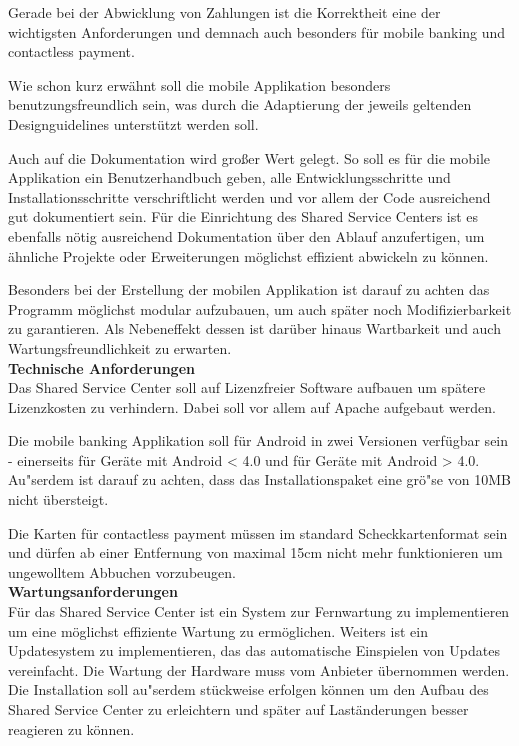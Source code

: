 Gerade bei der Abwicklung von Zahlungen ist die Korrektheit eine der wichtigsten Anforderungen und demnach auch besonders f\"ur mobile banking und contactless payment.

Wie schon kurz erw\"ahnt soll die mobile Applikation besonders benutzungsfreundlich sein, was durch die Adaptierung der jeweils geltenden Designguidelines unterst\"utzt werden soll.

Auch auf die Dokumentation wird gro\ss er Wert gelegt. So soll es f\"ur die mobile Applikation ein Benutzerhandbuch geben, alle Entwicklungsschritte und Installationsschritte verschriftlicht werden und vor allem der Code ausreichend gut dokumentiert sein. F\"ur die Einrichtung des Shared Service Centers ist es ebenfalls n\"otig ausreichend Dokumentation \"uber den Ablauf anzufertigen, um \"ahnliche Projekte oder Erweiterungen m\"oglichst effizient abwickeln zu k\"onnen.

Besonders bei der Erstellung der mobilen Applikation ist darauf zu achten das Programm m\"oglichst modular aufzubauen, um auch sp\"ater noch Modifizierbarkeit zu garantieren. Als Nebeneffekt dessen ist dar\"uber hinaus Wartbarkeit und auch Wartungsfreundlichkeit zu erwarten.\\

\textbf{Technische Anforderungen}\\
Das Shared Service Center soll auf Lizenzfreier Software aufbauen um sp\"atere Lizenzkosten zu verhindern. Dabei soll vor allem auf Apache aufgebaut werden. 

Die mobile banking Applikation soll f\"ur Android in zwei Versionen verf\"ugbar sein - einerseits f\"ur Ger\"ate mit Android < 4.0 und f\"ur Ger\"ate mit Android > 4.0. Au"serdem ist darauf zu achten, dass das Installationspaket eine gr\"o"se von 10MB nicht \"ubersteigt.

Die Karten f\"ur contactless payment m\"ussen im standard Scheckkartenformat sein und d\"urfen ab einer Entfernung von maximal 15cm nicht mehr funktionieren um ungewolltem Abbuchen vorzubeugen.\\

\textbf{Wartungsanforderungen}\\
F\"ur das Shared Service Center ist ein System zur Fernwartung zu implementieren um eine m\"oglichst effiziente Wartung zu erm\"oglichen. Weiters ist ein Updatesystem zu implementieren, das das automatische Einspielen von Updates vereinfacht. Die Wartung der Hardware muss vom Anbieter \"ubernommen werden. Die Installation soll au"serdem st\"uckweise erfolgen k\"onnen um den Aufbau des Shared Service Center zu erleichtern und sp\"ater auf Last\"anderungen besser reagieren zu k\"onnen.

